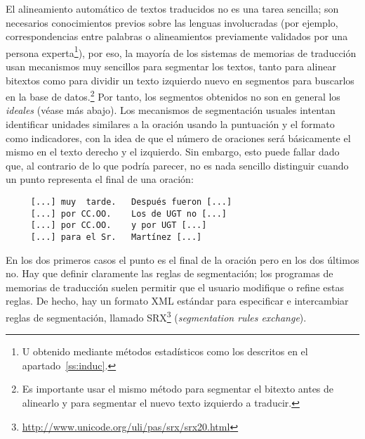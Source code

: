 El alineamiento automático de textos traducidos no es una tarea sencilla; son necesarios conocimientos previos sobre las lenguas involucradas (por ejemplo, correspondencias entre palabras o alineamientos previamente validados por una persona experta\footnote{U obtenido mediante métodos estadísticos como los descritos en el apartado~\ref{ss:induc}.}), por eso, la mayoría de los sistemas de memorias de traducción usan mecanismos muy sencillos para segmentar los textos, tanto para alinear bitextos como para dividir un texto izquierdo nuevo en segmentos para buscarlos en la base de datos.\footnote{Es importante usar el mismo método para segmentar el bitexto antes de alinearlo y para segmentar el nuevo texto izquierdo a traducir.} Por tanto, los segmentos obtenidos no son en general los \emph{ideales} (véase más abajo). Los mecanismos de segmentación usuales intentan identificar unidades similares a la oración usando la puntuación y el formato como indicadores, con la idea de que el número de oraciones será básicamente el mismo en el texto derecho y el izquierdo. Sin embargo, esto puede fallar dado que, al contrario de lo que podría parecer, no es nada sencillo distinguir cuando un punto representa el final de una oración: 
\begin{verbatim} 
     [...] muy  tarde.   Después fueron [...] 
     [...] por CC.OO.    Los de UGT no [...]
     [...] por CC.OO.    y por UGT [...] 
     [...] para el Sr.   Martínez [...] 
\end{verbatim} 
En los dos primeros casos el punto es el final de la oración pero en los dos últimos no. Hay que definir claramente las reglas de segmentación; los programas de memorias de traducción suelen permitir que el usuario modifique o refine estas reglas. De hecho, hay un formato XML estándar para especificar e intercambiar reglas de segmentación, llamado SRX\footnote{\url{http://www.unicode.org/uli/pas/srx/srx20.html}} (\emph{segmentation rules exchange}). 


